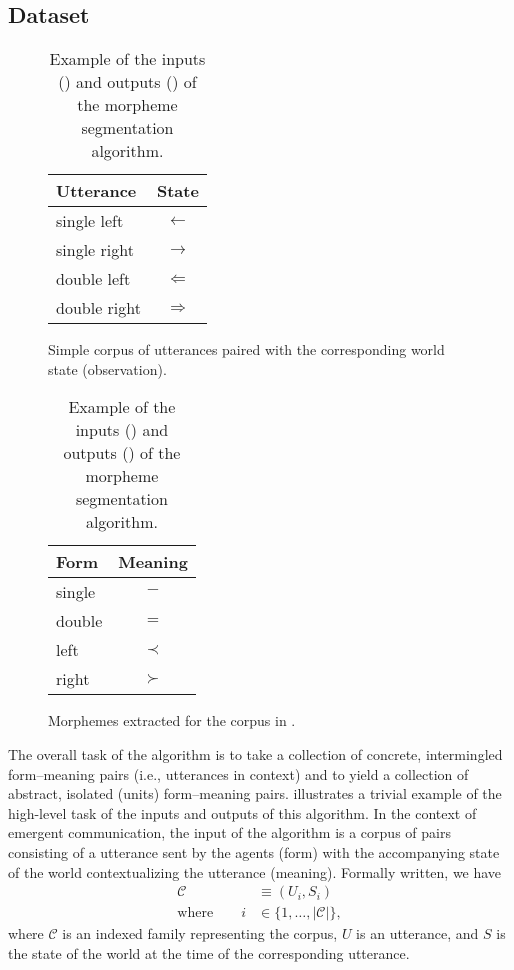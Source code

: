 \subsection{Dataset}
\begin{table}
  \centering
  \hfill
  \begin{subfigure}[t]{0.4\linewidth}
    \centering
    \begin{tabular}{lc}
      \toprule
      Utterance & State \\
      \midrule
      single left & $\leftarrow$ \\
      single right & $\rightarrow$ \\
      double left & $\Leftarrow$ \\
      double right & $\Rightarrow$ \\
      \bottomrule
    \end{tabular}
    \caption{Simple corpus of utterances paired with the corresponding world state (observation).}
    \unskip\label{tab:seg-corp}
  \end{subfigure}
  \hfill
  \begin{subfigure}[t]{0.4\linewidth}
    \centering
    \begin{tabular}{lc}
      \toprule
      Form & Meaning \\
      \midrule
      single & $-$ \\
      double & $=$ \\
      left & $\prec$ \\
      right & $\succ$ \\
      \bottomrule
    \end{tabular}
    \caption{Morphemes extracted for the corpus in .}
    \unskip\label{tab:seg-morph}
  \end{subfigure}
  \hfill
  \caption{Example of the inputs () and outputs () of the morpheme segmentation algorithm.}
  \unskip\label{tab:seg-example}
\end{table}


The overall task of the algorithm is to take a collection of concrete, intermingled form--meaning pairs (i.e., utterances in context) and to yield a collection of abstract, isolated (units) form--meaning pairs.
 illustrates a trivial example of the high-level task of the inputs and outputs of this algorithm.
In the context of emergent communication, the input of the algorithm is a corpus of pairs consisting of a utterance sent by the agents (form) with the accompanying state of the world contextualizing the utterance (meaning).
Formally written, we have
\begin{align}
  \mathcal C &\equiv (U_i, S_i) \\
  \text{where}\quad\quad i &\in \{1,\dots,|\mathcal C|\}
  ,
\end{align}
where $\mathcal C$ is an indexed family representing the corpus, $U$ is an utterance, and $S$ is the state of the world at the time of the corresponding utterance.

